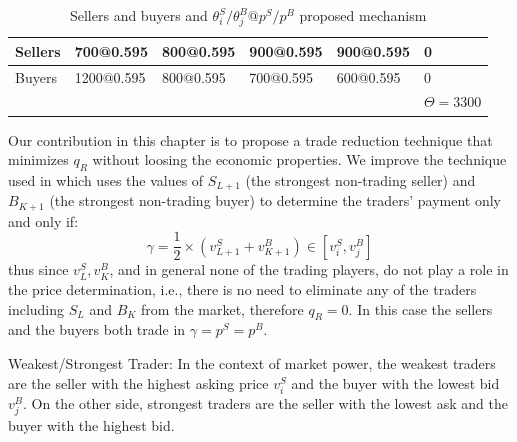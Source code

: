 \begin{enumerate}
\begin{table}
\begin{subtable}[t]{\textwidth}
\end{subtable}
\endgroup

\centering
\begingroup
\setlength{\tabcolsep}{2pt} %
\renewcommand{\arraystretch}{1} %
\begin{subtable}[t]{\textwidth}
\centering
\vspace{0pt}
\begin{tabular}{|L{2cm}|C{2cm}|C{2cm}|C{2cm}|C{2cm}|L{1.8cm}|}
\hline
Sellers & 700@0.595  & 800@0.595 & 900@0.595 & 900@0.595 & 0 \\ \hline
Buyers  & 1200@0.595 & 800@0.595 & 700@0.595 & 600@0.595 & 0 \\ \hline
{} &  &  &  &  &$\Theta= 3300$ \\ 
\end{tabular}
\caption{Sellers and buyers and $\theta_i^S/\theta_j^B@p^S/p^B$ proposed mechanism}
\label{tbl:sd:PROPOSED}
\end{subtable}
\endgroup
\label{tbl:sd}
\end{table}
\endgroup

Our contribution in this chapter is to propose a trade reduction technique that minimizes $q^{}_R$ without loosing the economic properties. We improve the technique used in \cite{MCAFEE1992434} which uses the values of $S_{L+1}$ (the strongest non-trading seller) and $B_{K+1}$ (the strongest non-trading buyer) to determine the traders' payment only and only if:
\begin{equation}
\gamma = {\frac{1}{2}}\times({v_{{L+1}}^{S}+v_{{K+1}}^B}) \in [v_{i}^{S},v_{j}^{{B}}]
\end{equation}
thus since $v_L^S, v_K^B$, and in general none of the trading players, do not play a role in the price determination, i.e., there is no need to eliminate any of the traders including $S_{L}$ and $B_{K}$ from the market, therefore $q^{}_R = 0$. In this case the sellers and the buyers both trade in $\gamma=p^S=p^B$.


\begin{Definition}
Weakest/Strongest Trader:
In the context of market power, the weakest traders are the seller with the highest asking price $v_{i}^S$ and the buyer with the lowest bid $v_{j}^{B}$. On the other side, strongest traders are the seller with the lowest ask and the buyer with the highest bid.
\end{Definition}


\end{enumerate}
